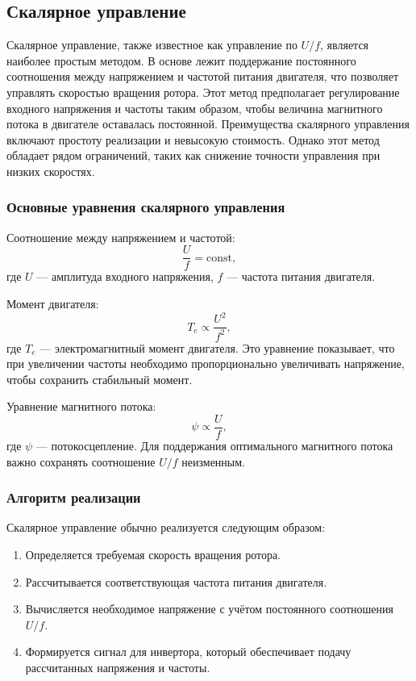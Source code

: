\documentclass[a4paper,14pt]{extarticle} %
\begin{document}
\subsection*{Скалярное управление}

Скалярное управление, также известное как управление по $U/f$, является наиболее простым методом. В основе лежит поддержание постоянного соотношения между напряжением и частотой питания двигателя, что позволяет управлять скоростью вращения ротора. Этот метод предполагает регулирование входного напряжения и частоты таким образом, чтобы величина магнитного потока в двигателе оставалась постоянной. Преимущества скалярного управления включают простоту реализации и невысокую стоимость. Однако этот метод обладает рядом ограничений, таких как снижение точности управления при низких скоростях.

\subsubsection*{Основные уравнения скалярного управления}

Соотношение между напряжением и частотой:
\begin{equation}
\frac{U}{f} = \text{const},
\end{equation}
где $U$ — амплитуда входного напряжения, $f$ — частота питания двигателя.

Момент двигателя:
\begin{equation}
T_e \propto \frac{U^2}{f^2},
\end{equation}
где $T_e$ — электромагнитный момент двигателя. Это уравнение показывает, что при увеличении частоты необходимо пропорционально увеличивать напряжение, чтобы сохранить стабильный момент.

Уравнение магнитного потока:
\begin{equation}
\psi \propto \frac{U}{f},
\end{equation}
где $\psi$ — потокосцепление. Для поддержания оптимального магнитного потока важно сохранять соотношение $U/f$ неизменным.

\subsubsection*{Алгоритм реализации}

Скалярное управление обычно реализуется следующим образом:
\begin{enumerate}
\item Определяется требуемая скорость вращения ротора.
\item Рассчитывается соответствующая частота питания двигателя.
\item Вычисляется необходимое напряжение с учётом постоянного соотношения $U/f$.
\item Формируется сигнал для инвертора, который обеспечивает подачу рассчитанных напряжения и частоты.
\end{enumerate}
\end{document}
